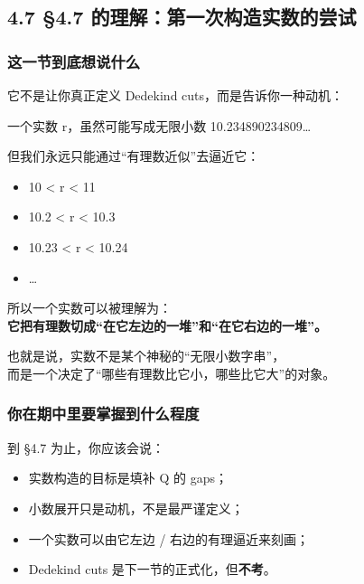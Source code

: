 \documentclass[
  11pt,
]{article}
\providecommand{\tightlist}{%
  \setlength{\itemsep}{0pt}\setlength{\parskip}{0pt}}
\begin{document}
\subsection{4.7 §4.7
的理解：第一次构造实数的尝试}\label{ux7684ux7406ux89e3ux7b2cux4e00ux6b21ux6784ux9020ux5b9eux6570ux7684ux5c1dux8bd5}

\subsubsection{这一节到底想说什么}\label{ux8fd9ux4e00ux8282ux5230ux5e95ux60f3ux8bf4ux4ec0ux4e48}

它不是让你真正定义 Dedekind cuts，而是告诉你一种动机：

一个实数 r，虽然可能写成无限小数 10.234890234809\ldots{}

但我们永远只能通过``有理数近似''去逼近它：

\begin{itemize}
\tightlist
\item
  10 \textless{} r \textless{} 11
\item
  10.2 \textless{} r \textless{} 10.3
\item
  10.23 \textless{} r \textless{} 10.24
\item
  \ldots{}
\end{itemize}

所以一个实数可以被理解为：\\
\textbf{它把有理数切成``在它左边的一堆''和``在它右边的一堆''。}

也就是说，实数不是某个神秘的``无限小数字串''，\\
而是一个决定了``哪些有理数比它小，哪些比它大''的对象。

\subsubsection{你在期中里要掌握到什么程度}\label{ux4f60ux5728ux671fux4e2dux91ccux8981ux638cux63e1ux5230ux4ec0ux4e48ux7a0bux5ea6}

到 §4.7 为止，你应该会说：

\begin{itemize}
\tightlist
\item
  实数构造的目标是填补 Q 的 gaps；
\item
  小数展开只是动机，不是最严谨定义；
\item
  一个实数可以由它左边 / 右边的有理逼近来刻画；
\item
  Dedekind cuts 是下一节的正式化，但\textbf{不考}。
\end{itemize}
\end{document}
